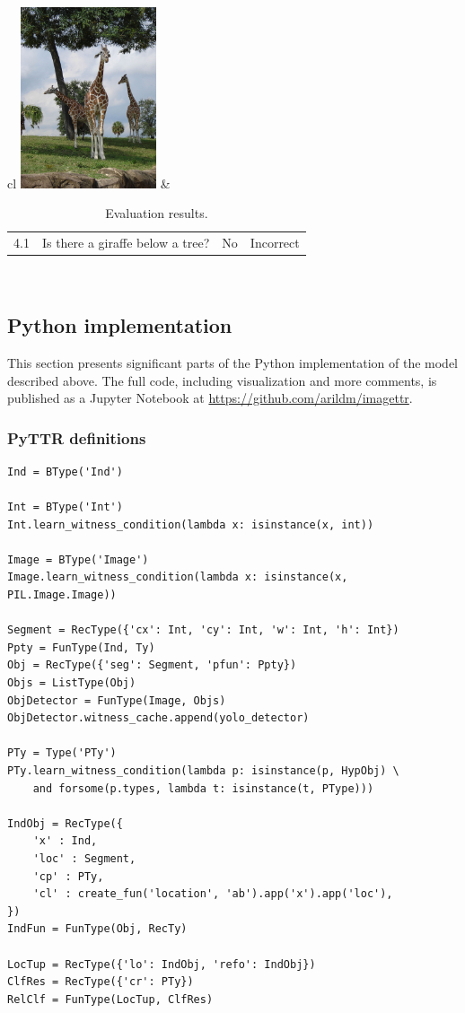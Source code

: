 \begin{table}
\begin{tabular}{cl}
	\includegraphics[width=0.3\textwidth]{vqa4.jpg} &
	\begin{tabular}{llll}
		4.1 & Is there a giraffe below a tree? & No & Incorrect
		\end{tabular} \\
		
  	\end{tabular}
\caption{Evaluation results.}
\label{tab:eval}
\end{table}



\subsection{Python implementation}
\label{ssec:python}

This section presents significant parts of the Python implementation of the model described above.
The full code, including visualization and more comments, is published as a Jupyter Notebook at \url{https://github.com/arildm/imagettr}.



\subsubsection{PyTTR definitions}

\begin{lstlisting}[label={lst:pyttrbasic}, caption=TTR type definitions]
Ind = BType('Ind')

Int = BType('Int')
Int.learn_witness_condition(lambda x: isinstance(x, int))

Image = BType('Image')
Image.learn_witness_condition(lambda x: isinstance(x, PIL.Image.Image))

Segment = RecType({'cx': Int, 'cy': Int, 'w': Int, 'h': Int})
Ppty = FunType(Ind, Ty)
Obj = RecType({'seg': Segment, 'pfun': Ppty})
Objs = ListType(Obj)
ObjDetector = FunType(Image, Objs)
ObjDetector.witness_cache.append(yolo_detector)

PTy = Type('PTy')
PTy.learn_witness_condition(lambda p: isinstance(p, HypObj) \
    and forsome(p.types, lambda t: isinstance(t, PType)))

IndObj = RecType({
    'x' : Ind,
    'loc' : Segment,
    'cp' : PTy,
    'cl' : create_fun('location', 'ab').app('x').app('loc'),
})
IndFun = FunType(Obj, RecTy)

LocTup = RecType({'lo': IndObj, 'refo': IndObj})
ClfRes = RecType({'cr': PTy})
RelClf = FunType(LocTup, ClfRes)
\end{lstlisting}



